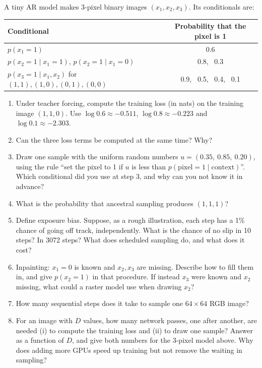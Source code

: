 \documentclass[12pt,a4paper]{article}
\begin{document}
A tiny AR model makes 3-pixel binary images $(x_1,x_2,x_3)$. Its conditionals are:
\begin{center}
\begin{tabular}{@{}lc@{}}
\toprule
Conditional & Probability that the pixel is 1 \\
\midrule
$p(x_1=1)$ & 0.6 \\
$p(x_2=1\mid x_1=1)$, $p(x_2=1\mid x_1=0)$ & 0.8, \ 0.3 \\
$p(x_3=1\mid x_1,x_2)$ for $(1,1),(1,0),(0,1),(0,0)$ & 0.9, \ 0.5, \ 0.4, \ 0.1 \\
\bottomrule
\end{tabular}
\end{center}
\begin{enumerate}[label=(\alph*)]
  \item Under teacher forcing, compute the training loss (in nats) on the training image $(1,1,0)$. Use $\log0.6\approx-0.511$, $\log0.8\approx-0.223$ and $\log0.1\approx-2.303$.
  \item Can the three loss terms be computed at the same time? Why?
  \item[\colorbox{yellow}{(c)}] Draw one sample with the uniform random numbers $u=(0.35,\ 0.85,\ 0.20)$, using the rule ``set the pixel to 1 if $u$ is less than $p(\text{pixel}=1\mid\text{context})$''. Which conditional did you use at step 3, and why can you not know it in advance?
  \item What is the probability that ancestral sampling produces $(1,1,1)$?
  \item[\colorbox{yellow}{(e)}] Define exposure bias. Suppose, as a rough illustration, each step has a 1\% chance of going off track, independently. What is the chance of no slip in 10 steps? In 3072 steps? What does scheduled sampling do, and what does it cost?
  \item[\colorbox{yellow}{(f)}] Inpainting: $x_1=0$ is known and $x_2,x_3$ are missing. Describe how to fill them in, and give $p(x_2=1)$ in that procedure. If instead $x_3$ were known and $x_2$ missing, what could a raster model use when drawing $x_2$?
  \item How many sequential steps does it take to sample one $64\times64$ RGB image?
  \item For an image with $D$ values, how many network passes, one after another, are needed (i) to compute the training loss and (ii) to draw one sample? Answer as a function of $D$, and give both numbers for the 3-pixel model above. Why does adding more GPUs speed up training but not remove the waiting in sampling?
\end{enumerate}
\end{document}

